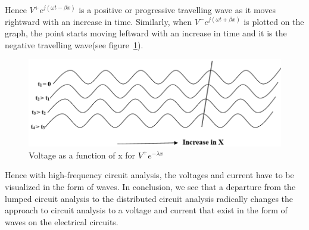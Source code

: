 Hence  $ V^{+}e^{j(\omega t- \beta x )} $ is a positive or progressive travelling wave as it moves rightward with an increase in time. Similarly, when $ V^{-}e^{j( \omega t+ \beta x )} $ is plotted on the graph, the point starts moving leftward with an increase in time and it is the negative travelling wave(see figure~\ref{fig:abcd}).
\begin{figure}[h]
\centering
\includegraphics[width=1\linewidth]{./graphics/ABCD}
\caption{Voltage as a function of x for $V^+e^{-\lambda x}$}
\label{fig:abcd}
\end{figure}

Hence with high-frequency circuit analysis, the voltages and current have to be visualized in the form of waves. In conclusion, we see that a departure from the lumped circuit analysis to the distributed circuit analysis radically changes the approach to circuit analysis to a voltage and current that exist in the form of waves on the electrical circuits. 

